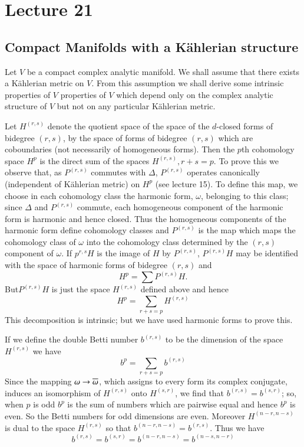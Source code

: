 \chapter{Lecture 21}

\section*{Compact Manifolds with a K\"ahlerian
  structure}\pageoriginale

Let $V$ be a compact complex analytic manifold. We shall assume that
there exists a K\"ahlerian metric on $V$. From this assumption we
shall derive some intrinsic properties of $V$ \iec properties of $V$
which depend only on the complex analytic structure of $V$ but not on
any particular K\"ahlerian metric.

Let $H^{(r,s)}$ denote the quotient space of the space of the
$d$-closed forms of bidegree $(r,s)$, by the space of forms of
bidegree $(r,s)$ which are coboundaries (not necessarily of
homogeneous forms). Then the $p$th cohomology space $H^{p}$ is the
direct sum of the spaces $H^{(r,s)},r+s=p$. To prove this we observe
that, as $P^{(r,s)}$ commutes with $\Delta$, $P^{(r,s)}$ operates
canonically (\iec independent of K\"ahlerian metric) on $H^{p}$ (see
lecture 15). To define this map, we choose in each cohomology class
the harmonic form, $\omega$, belonging to this class; since $\Delta$
and $P^{(r,s)}$ commute, each homogeneous component of the harmonic
form is harmonic and hence closed. Thus the homogeneous components of
the harmonic form define cohomology classes and $P^{(r,s)}$ is the map
which maps the cohomology class of $\omega$ into the cohomology class
determined by the $(r,s)$ component of $\omega$. If $p^{r,s}H$ is the
image of $H$ by $P^{(r,s)}$, $P^{(r,s)}H$ may be identified with the
space of harmonic forms of bidegree $(r,s)$ and 
$$
H^{p}=\sum P^{(r,s)}H.
$$
But\pageoriginale $P^{(r,s)}H$ is just the space $H^{(r,s)}$ defined
above and hence
$$
H^{p}=\sum_{r+s=p}H^{(r,s)}
$$
This decomposition is intrinsic; but we have used harmonic forms to
prove this.

If we define the double Betti number $b^{(r,s)}$ to be the dimension
of the space $H^{(r,s)}$ we have
$$
b^{p}=\sum_{r+s=p}b^{(r,s)}
$$
Since the mapping $\omega\to \overline{\omega}$, which assigns to every form
its complex conjugate, induces an isomorphism of $H^{(r,s)}$ onto
$H^{(s,r)}$, we find that $b^{(r,s)}=b^{(s,r)}$; so, when $p$ is odd
$b^{p}$ is the sum of numbers which are pairwise equal and hence
$b^{p}$ is even. So the Betti numbers for odd dimensions are
even. Moreover $H^{(n-r,n-s)}$ is dual to the space $H^{(r,s)}$ so
that $b^{(n-r,n-s)}=b^{(r,s)}$. Thus we have
$$
b^{(r,s)}=b^{(s,r)}=b^{(n-r,n-s)}=b^{(n-s,n-r)}
$$

